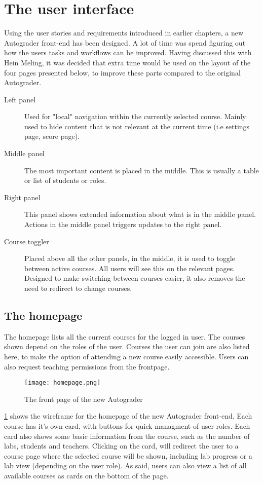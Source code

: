 \section{The user interface}

Using the user stories and requirements introduced in earlier chapters, a new Autograder front-end has been designed. A lot of time was spend figuring out how the users tasks and workflows can be improved. Having discussed this with Hein Meling, it was decided that extra time would be used on the layout of the four pages presented below, to improve these parts compared to the original Autograder.

\begin{description}
\item [Left panel] Used for "local" navigation within the currently selected course. Mainly used to hide content that is not relevant at the current time (i.e settings page, score page).
\item [Middle panel] The most important content is placed in the middle. This is usually a table or list of students or roles.
\item [Right panel] This panel shows extended information about what is in the middle panel. Actions in the middle panel triggers updates to the right panel.
\item [Course toggler] Placed above all the other panels, in the middle, it is used to toggle between active courses. All users will see this on the relevant pages. Designed to make switching between courses easier, it also removes the need to redirect to change courses.
\end{description}

\subsection{The homepage}
The homepage lists all the current courses for the logged in user. The courses shown depend on the roles of the user. Courses the user can join are also listed here, to make the option of attending a new course easily accessible. Users can also request teaching permissions from the frontpage.

\begin{figure}[h!]
	 \centering
   \texttt{[image: homepage.png]}
   \caption{The front page of the new Autograder}
   \label{fig:homepageAutograder}
\end{figure}

\ref{fig:homepageAutograder} shows the wireframe for the homepage of the new Autograder front-end. Each course has it's own card, with buttons for quick managment of user roles. Each card also shows some basic information from the course, such as the number of labs, students and teachers. Clicking on the card, will redirect the user to a course page where the selected course will be shown, including lab progress or a lab view (depending on the user role). As said, users can also view a list of all available courses as cards on the bottom of the page.

